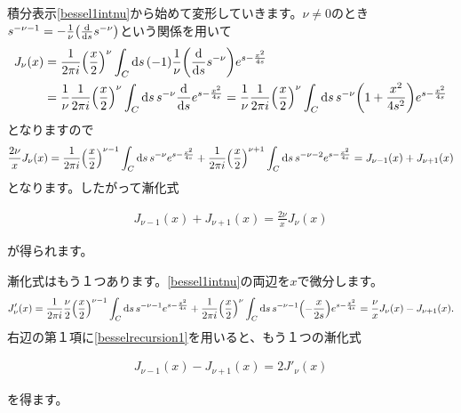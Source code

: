 \documentclass[report,paper=a4, fontsize=12pt, line_length=16cm, number_of_lines=33,dvipdfmx]{jlreq}
\newenvironment{important}{\begin{tcolorbox}[
  colback = white,
  colframe = red!35,
  boxrule = 2mm,
  fonttitle = \bfseries,
  after = \noindent] }{\end{tcolorbox}}
\numberwithin{equation}{section}
\begin{document}
積分表示\eqref{bessel1intnu}から始めて変形していきます。$\nu\ne 0$のとき$s^{-\nu-1}=-\frac{1}{\nu}\qty(\dv{s}s^{-\nu})$という関係を用いて
\begin{align}
  J_{\nu}(x)
  &=\frac{1}{2\pi i}\qty(\frac{x}{2})^{\nu}\int_{C}\dd{s}(-1)\frac{1}{\nu}\qty(\dv{s}s^{-\nu})
  e^{s-\frac{x^2}{4s}}\nonumber\\
  &=\frac{1}{\nu}\frac{1}{2\pi i}\qty(\frac{x}{2})^{\nu}\int_{C}\dd{s}s^{-\nu}\dv{s}
  e^{s-\frac{x^2}{4s}}
  =\frac{1}{\nu}\frac{1}{2\pi i}\qty(\frac{x}{2})^{\nu}\int_{C}\dd{s}s^{-\nu}\qty(1+\frac{x^2}{4s^2})
  e^{s-\frac{x^2}{4s}}    
\end{align}
となりますので
\begin{align}
  \frac{2\nu}{x}J_{\nu}(x)=\frac{1}{2\pi i}\qty(\frac{x}{2})^{\nu-1}\int_{C}\dd{s}s^{-\nu}
  e^{s-\frac{x^2}{4s}}
  +\frac{1}{2\pi i}\qty(\frac{x}{2})^{\nu+1}\int_{C}\dd{s}s^{-\nu-2}
  e^{s-\frac{x^2}{4s}}
  =J_{\nu-1}(x)+J_{\nu+1}(x)
\end{align}
となります。したがって漸化式
\begin{important}
  \begin{align}
    J_{\nu-1}(x)+J_{\nu+1}(x)=\frac{2\nu}{x}J_{\nu}(x)
    \label{besselrecursion1}
  \end{align}
\end{important}
が得られます。

漸化式はもう１つあります。\eqref{bessel1intnu}の両辺を$x$で微分します。
\begin{align}
  J'_{\nu}(x)=
  \frac{1}{2\pi i}\frac{\nu}{2}\qty(\frac{x}{2})^{\nu-1}\int_{C}\dd{s}s^{-\nu-1}e^{s-\frac{x^2}{4s}}
  +\frac{1}{2\pi i}\qty(\frac{x}{2})^{\nu}\int_{C}\dd{s}s^{-\nu-1}\qty(-\frac{x}{2s})e^{s-\frac{x^2}{4s}}
  =\frac{\nu}{x}J_{\nu}(x)-J_{\nu+1}(x).
\end{align}
右辺の第１項に\eqref{besselrecursion1}を用いると、もう１つの漸化式
\begin{important}
  \begin{align}
    J_{\nu-1}(x)-J_{\nu+1}(x)=2J'_{\nu}(x)\label{besselrecursion2}
  \end{align}
\end{important}
を得ます。
\end{document}
